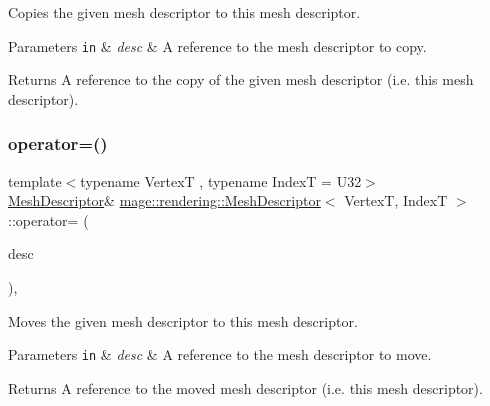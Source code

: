 Copies the given mesh descriptor to this mesh descriptor.


\begin{DoxyParams}[1]{Parameters}
\mbox{\tt in}  & {\em desc} & A reference to the mesh descriptor to copy. \\
\hline
\end{DoxyParams}
\begin{DoxyReturn}{Returns}
A reference to the copy of the given mesh descriptor (i.\+e. this mesh descriptor). 
\end{DoxyReturn}
\mbox{\label{classmage_1_1rendering_1_1_mesh_descriptor_aa6094035cdaff6213b7156cead0c0381}} 
\subsubsection{\texorpdfstring{operator=()}{operator=()}\hspace{0.1cm}{\footnotesize\ttfamily [2/2]}}
{\footnotesize\ttfamily template$<$typename VertexT , typename IndexT  = U32$>$ \\
\mbox{\hyperlink{classmage_1_1rendering_1_1_mesh_descriptor}{Mesh\+Descriptor}}\& \mbox{\hyperlink{classmage_1_1rendering_1_1_mesh_descriptor}{mage\+::rendering\+::\+Mesh\+Descriptor}}$<$ VertexT, IndexT $>$\+::operator= (\begin{DoxyParamCaption}\item[{\mbox{\hyperlink{classmage_1_1rendering_1_1_mesh_descriptor}{Mesh\+Descriptor}}$<$ VertexT, IndexT $>$ \&\&}]{desc }\end{DoxyParamCaption})\hspace{0.3cm}{\ttfamily [default]}, {\ttfamily [noexcept]}}

Moves the given mesh descriptor to this mesh descriptor.


\begin{DoxyParams}[1]{Parameters}
\mbox{\tt in}  & {\em desc} & A reference to the mesh descriptor to move. \\
\hline
\end{DoxyParams}
\begin{DoxyReturn}{Returns}
A reference to the moved mesh descriptor (i.\+e. this mesh descriptor). 
\end{DoxyReturn}


